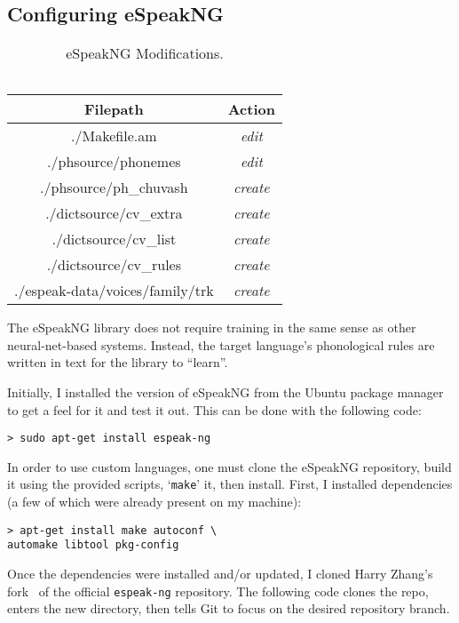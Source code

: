 \documentclass[11pt,a4paper]{article}
\begin{document}
\subsection{Configuring eSpeakNG}
\begin{table}[t!]
	\begin{center}
		\begin{tabular}{|c|c|}
			\hline \bf Filepath & \bf Action \\\hline
			./Makefile.am & \it edit\\\hline
			./phsource/phonemes & \it edit\\\hline
			./phsource/ph\_chuvash & \it create\\\hline
			./dictsource/cv\_extra & \it create\\\hline
			./dictsource/cv\_list & \it create\\\hline
			./dictsource/cv\_rules & \it create\\\hline
			./espeak-data/voices/family/trk & \it create\\\hline
		\end{tabular}
	\end{center}
	\caption{\label{espeak-table} eSpeakNG Modifications.\\~\cite{jrmeyer-espeak} }
\end{table}

The eSpeakNG library does not require training in the same sense as other neural-net-based systems. Instead, the target language's phonological rules are written in text for the library to ``learn''.

Initially, I installed the version of eSpeakNG from the Ubuntu package manager to get a feel for it and test it out. This can be done with the following code:
\begin{verbatim}
> sudo apt-get install espeak-ng
\end{verbatim}

In order to use custom languages, one must clone the eSpeakNG repository, build it using the provided scripts, `\texttt{make}' it, then install. First, I installed dependencies (a few of which were already present on my machine):

\begin{verbatim}
> apt-get install make autoconf \
automake libtool pkg-config
\end{verbatim}

Once the dependencies were installed and/or updated, I cloned Harry Zhang's fork~\cite{espeak-cv} of the official \texttt{espeak-ng} repository. The following code clones the repo, enters the new directory, then tells Git to focus on the desired repository branch.
\end{document}
